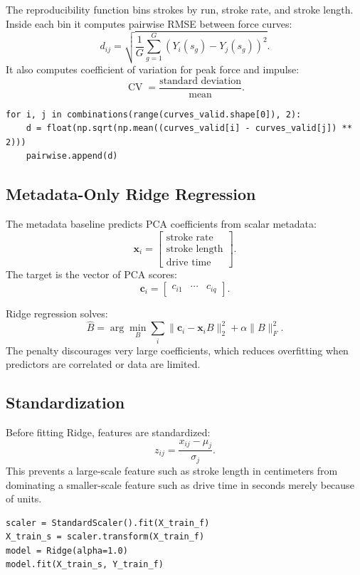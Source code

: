 \documentclass[11pt]{article}
\newcommand{\vect}[1]{\boldsymbol{#1}}
\begin{document}
The reproducibility function bins strokes by run, stroke rate, and stroke
length. Inside each bin it computes pairwise RMSE between force curves:
\[
  d_{ij}
  =
  \sqrt{\frac{1}{G}\sum_{g=1}^{G}
  \left(Y_i(s_g)-Y_j(s_g)\right)^2}.
\]
It also computes coefficient of variation for peak force and impulse:
\[
  \operatorname{CV}
  =
  \frac{\text{standard deviation}}{\text{mean}}.
\]

\begin{lstlisting}
for i, j in combinations(range(curves_valid.shape[0]), 2):
    d = float(np.sqrt(np.mean((curves_valid[i] - curves_valid[j]) ** 2)))
    pairwise.append(d)
\end{lstlisting}

\subsection{Metadata-Only Ridge Regression}

The metadata baseline predicts PCA coefficients from scalar metadata:
\[
  \vect{x}_i =
  \begin{bmatrix}
  \text{stroke rate}\\
  \text{stroke length}\\
  \text{drive time}
  \end{bmatrix}.
\]
The target is the vector of PCA scores:
\[
  \vect{c}_i =
  \begin{bmatrix}
  c_{i1} & \cdots & c_{iq}
  \end{bmatrix}.
\]

Ridge regression solves:
\[
  \hat{B}
  =
  \arg\min_B
  \sum_i \|\vect{c}_i - \vect{x}_iB\|_2^2
  +
  \alpha\|B\|_F^2.
\]
The penalty discourages very large coefficients, which reduces overfitting
when predictors are correlated or data are limited.

\subsection{Standardization}

Before fitting Ridge, features are standardized:
\[
  z_{ij} = \frac{x_{ij}-\mu_j}{\sigma_j}.
\]
This prevents a large-scale feature such as stroke length in centimeters from
dominating a smaller-scale feature such as drive time in seconds merely because
of units.

\begin{lstlisting}
scaler = StandardScaler().fit(X_train_f)
X_train_s = scaler.transform(X_train_f)
model = Ridge(alpha=1.0)
model.fit(X_train_s, Y_train_f)
\end{lstlisting}
\end{document}
